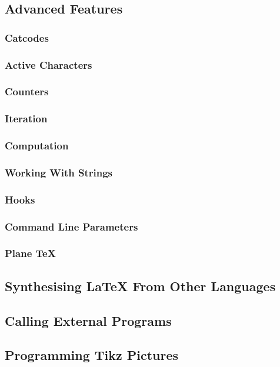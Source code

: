 \subsection{Advanced Features}
\subsubsection{Catcodes}
\subsubsection{Active Characters}
\subsubsection{Counters}
\subsubsection{Iteration}
\subsubsection{Computation}
\subsubsection{Working With Strings}
\subsubsection{Hooks}
\subsubsection{Command Line Parameters}
\subsubsection{Plane \TeX}


\subsection{Synthesising \LaTeX{} From Other Languages}


\subsection{Calling External Programs}


\subsection{Programming Tikz Pictures}
